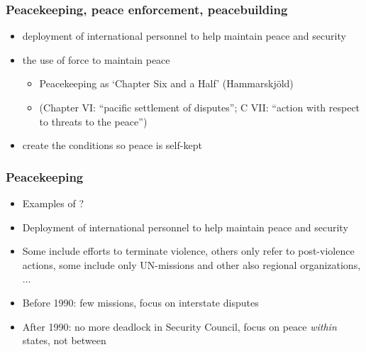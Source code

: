 \documentclass[aspectratio=43]{beamer}
\begin{document}
\begin{frame}
\frametitle{Peacekeeping, peace enforcement, peacebuilding}
\centering

\begin{itemize}[<+->]
  \item \textbf{{\color{red}{Peacekeeping:}}} deployment of international personnel to help maintain peace and security
  \item \textbf{{\color{red}{Peace enforcement:}}} the use of force to maintain peace
  \begin{itemize}
    \item Peacekeeping as `Chapter Six and a Half' (Hammarskjöld)
    \item (Chapter VI: ``pacific settlement of disputes''; C VII: ``action with respect to threats to the peace'')
  \end{itemize}
  \item \textbf{{\color{red}{Peacebuilding:}}} create the conditions so peace is self-kept
\end{itemize}

\end{frame}

\begin{frame}
\frametitle{Peacekeeping}
\centering

  \begin{itemize}[<+->]
    \item Examples of ?
    \item Deployment of international personnel to help maintain peace and security
    \item Some include efforts to terminate violence, others only refer to post-violence actions, some include only UN-missions and other also regional organizations, ...
    \item Before 1990: few missions, focus on interstate disputes
    \item After 1990: no more deadlock in Security Council, focus on peace \textit{within} states, not between
  \end{itemize}

\end{frame}
\end{document}
